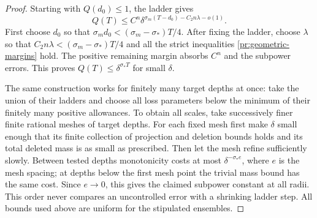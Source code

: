 \begin{proof}
Starting with $Q(d_0)\le1$, the ladder gives
\[
 Q(T)\le C^n
       \delta^{\sigma_m(T-d_0)-C_2n\lambda-o(1)}.
\]
First choose $d_0$ so that
$\sigma_m d_0<(\sigma_m-\sigma_*)T/4$.
After fixing the ladder, choose $\lambda$ so that
$C_2n\lambda<(\sigma_m-\sigma_*)T/4$ and all the strict
inequalities \eqref{pr:geometric-margins} hold.
The positive remaining margin absorbs $C^n$ and the subpower
errors. This proves $Q(T)\le\delta^{\sigma_*T}$ for small
$\delta$.

The same construction works for finitely many target depths at once:
take the union of their ladders and choose all loss parameters below
the minimum of their finitely many positive allowances.
To obtain all scales, take successively finer finite rational meshes
of target depths. For each fixed mesh first make $\delta$ small
enough that its finite collection of projection and deletion bounds
holds and its total deleted mass is as small as prescribed.
Then let the mesh refine sufficiently slowly. Between tested
depths monotonicity costs at most $\delta^{-\sigma_*e}$, where
$e$ is the mesh spacing; at depths below the first mesh point the
trivial mass bound has the same cost. Since $e\to0$, this gives the
claimed subpower constant at all radii. This order never compares
an uncontrolled error with a shrinking ladder step.
All bounds used above are uniform for the stipulated ensembles.
\end{proof}

